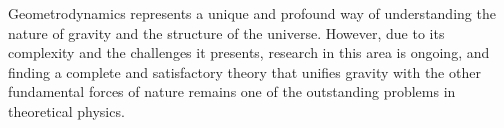 Geometrodynamics represents a unique and profound way of understanding the nature of gravity and the structure of the universe. However, due to its complexity and the challenges it presents, research in this area is ongoing, and finding a complete and satisfactory theory that unifies gravity with the other fundamental forces of nature remains one of the outstanding problems in theoretical physics.
